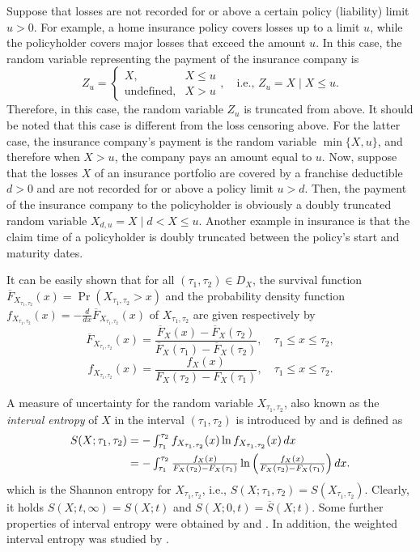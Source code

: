 \documentclass[11pt]{article}
\begin{document}
Suppose that losses are not recorded for or above a certain policy (liability) limit $u > 0$. For example, a home insurance policy covers losses up to a limit $u$, while the policyholder covers major losses that exceed the amount $u$. In this case, the random variable representing the payment of the insurance company is
{\small $$
	Z_u = \begin{cases}
		X, & X \leq u \\
		\text{undefined}, & X > u
	\end{cases}, \quad \text{i.e., } Z_u = X \mid X \leq u.
	$$}Therefore, in this case, the random variable $Z_u$ is truncated from above. It should be noted that this case is different from the loss censoring above. For the latter case, the insurance company's payment is the random variable $\min\{X, u\}$, and therefore when $X > u$, the company pays an amount equal to $u$. Now, suppose that the losses $X$ of an insurance portfolio are covered by a franchise deductible $d > 0$ and are not recorded for or above a policy limit $u > d$. Then, the payment of the insurance company to the policyholder is obviously a doubly truncated random variable $X_{d,u} = X \mid d < X \leq u$. Another example in insurance is that the claim time of a policyholder is doubly truncated between the policy’s start and maturity dates.

It can be easily shown that for all $(\tau_1, \tau_2) \in D_X$, the survival function $ \textstyle \overline{F}_{X_{\tau_1,\tau_2}}(x) = \Pr(X_{\tau_1,\tau_2} > x)$ and the probability density function $ \textstyle f_{X_{\tau_1,\tau_2}}(x) = -\frac{d}{dx} \overline{F}_{X_{\tau_1,\tau_2}}(x)$ of $X_{\tau_1,\tau_2}$ are given respectively by
$$ \textstyle 
\overline{F}_{X_{\tau_1,\tau_2}}(x) = \frac{\overline{F}_X(x) - \overline{F}_X(\tau_2)}{\overline{F}_X(\tau_1) - \overline{F}_X(\tau_2)}, \quad \tau_1 \leq x \leq \tau_2,
$$
$$ \textstyle
f_{X_{\tau_1,\tau_2}}(x) = \frac{f_X(x)}{F_X(\tau_2) - F_X(\tau_1)}, \quad \tau_1 \leq x \leq \tau_2.
$$

A measure of uncertainty for the random variable $X_{\tau_1,\tau_2}$, also known as the \textit{interval entropy} of $X$ in the interval $(\tau_1, \tau_2)$ is introduced by \cite{Sunoj2009} and is defined as 
\begin{align}
	S(X; \tau_1, \tau_2) &= \textstyle -\int_{\tau_1}^{\tau_2} f_{X_{\tau_1,\tau_2}}(x) \ln f_{X_{\tau_1,\tau_2}}(x) \, dx \notag \\
	&= \textstyle -\int_{\tau_1}^{\tau_2} \frac{f_X(x)}{F_X(\tau_2) - F_X(\tau_1)} \ln \left( \frac{f_X(x)}{F_X(\tau_2) - F_X(\tau_1)} \right) dx.
\end{align}
which is the Shannon entropy for $X_{\tau_1,\tau_2}$, i.e., $S(X;\tau_1,\tau_2) = S(X_{\tau_1,\tau_2})$. Clearly, it holds $S(X;t,\infty) = S(X;t)$ and $S(X;0,t) = \overline{S}(X;t)$. Some further properties of interval entropy were obtained by \cite{Misagh2012} and \cite{Moharana2020}. In addition, the weighted interval entropy was studied by \cite{Misagh2011}.
\end{document}

